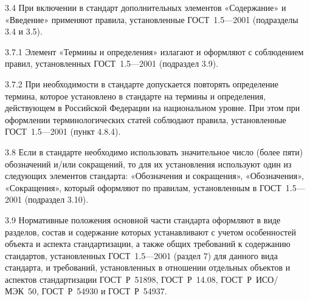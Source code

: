 \documentclass[12pt, twoside, final]{ruost}
\begin{document}
\begin{OST}
					\begin{stdquote}
						\par 3.4 При включении в стандарт дополнительных элементов «Содержание» и «Введение» применяют правила, установленные ГОСТ~1.5—2001 (подразделы 3.4 и 3.5).
						\par [ГОСТ Р 1.5---2012]
					\end{stdquote}
					
					\begin{stdquote}
						\par 3.7.1 Элемент «Термины и определения» излагают и оформляют с соблюдением правил, установленных ГОСТ~1.5—2001 (подраздел 3.9).
						\par [ГОСТ Р 1.5---2012]
					\end{stdquote}
					
					\begin{stdquote}
						\par 3.7.2 При необходимости в стандарте допускается повторять определение термина, которое установлено в стандарте на термины и определения, действующем в Российской Федерации на национальном уровне. При этом при оформлении терминологических статей соблюдают правила, установленные ГОСТ~1.5—2001 (пункт 4.8.4).
						\par [ГОСТ Р 1.5---2012]
					\end{stdquote}
					
					\begin{stdquote}
						\par 3.8 Если в стандарте необходимо использовать значительное число (более пяти) обозначений и/или сокращений, то для их установления используют один из следующих элементов стандарта: «Обозначения и сокращения», «Обозначения», «Сокращения», который оформляют по правилам, установленным в ГОСТ~1.5—2001 (подраздел 3.10).
						\par [ГОСТ Р 1.5---2012]
					\end{stdquote}
					
					\begin{stdquote}
						\par 3.9 Нормативные положения основной части стандарта оформляют в виде разделов, состав и содержание которых устанавливают с учетом особенностей объекта и аспекта стандартизации, а также общих требований к содержанию стандартов, установленных ГОСТ~1.5—2001 (раздел 7) для данного вида стандарта, и требований, установленных в отношении отдельных объектов и аспектов стандартизации ГОСТ~Р~51898, ГОСТ~Р~14.08, ГОСТ~Р~ИСО/МЭК~50, ГОСТ~Р~54930 и ГОСТ~Р~54937.
						\par [ГОСТ Р 1.5---2012]
					\end{stdquote}
					

\end{OST}
\end{document}
